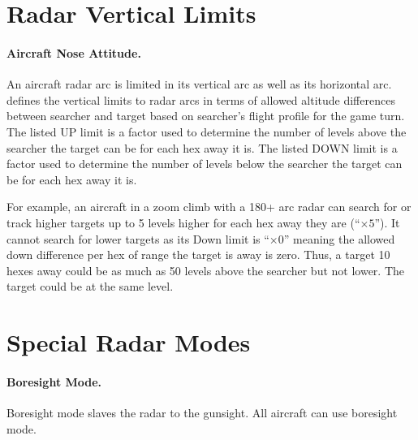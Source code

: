 \begin{advancedrules}

\section{Radar Vertical Limits}
\label{rule:radar-vertical-limits}

\paragraph{Aircraft Nose Attitude.} An aircraft radar arc is limited in its vertical arc as well as its horizontal arc.  defines the vertical limits to radar arcs in terms of allowed altitude differences between searcher and target based on searcher's flight profile for the game turn. The listed UP limit is a factor used to determine the number of levels above the searcher the target can be for each hex away it is. The listed DOWN limit is a factor used to determine the number of levels below the searcher the target can be for each hex away it is. 

For example, an aircraft in a zoom climb with a 180+ arc radar can search for or track higher targets up to 5 levels higher for each hex away they are (“$\times5$”). It cannot search for lower targets as its Down limit is “$\times0$” meaning the allowed down difference per hex of range the target is away is zero. Thus, a target 10 hexes away could be as much as 50 levels above the searcher but not lower. The target could be at the same level.

\section{Special Radar Modes}
\label{rule:special-radar-modes}

\paragraph{Boresight Mode.}\label{rule:boresight-mode} Boresight mode slaves the radar to the gunsight. All aircraft can use boresight mode.  


\end{advancedrules}

